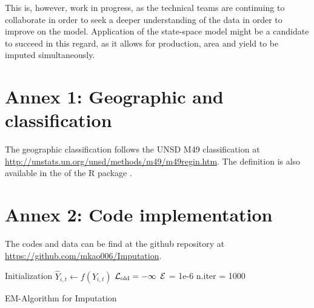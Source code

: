 \documentclass[nojss]{jss}\usepackage{graphicx, color}
\begin{document}
This is, however, work in progress, as the technical teams are
continuing to collaborate in order to seek a deeper understanding of
the data in order to improve on the model. Application of the
state-space model might be a candidate to succeed in this regard, as
it allows for production, area and yield to be imputed simultaneously.




\section*{Annex 1: Geographic and classification}

The geographic classification follows the UNSD M49 classification at
\url{http://unstats.un.org/unsd/methods/m49/m49regin.htm}. The
definition is also available in the  of the R
package .

\section*{Annex 2: Code implementation}

The codes and data can be find at the github repository at
\url{https://github.com/mkao006/Imputation}.

\begin{algorithm}
  \SetAlgoLined
  \BlankLine
  Initialization\;
  \Indp\Indp\Indp 
  $\hat{Y}_{i, t} \leftarrow f(Y_{i, t})$\;
  $\cal{L}_{\text{old}} = -\infty$\;
  $\cal{E}$ = 1e-6\;
  n.iter = 1000\;
  \Indm\Indm\Indm 
  
    \caption{EM-Algorithm for Imputation}
    \label{alg:imputation}
\end{algorithm}
  
      
\end{document}
